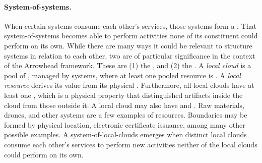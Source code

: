 \paragraph{System-of-systems.}
When certain systems consume each other's services, those systems form a .
That system-of-systems becomes able to perform activities none of its constituent  could perform on its own.
While there are many ways it could be relevant to structure systems in relation to each other, two are of particular significance in the context of the Arrowhead framework.
These are (1) the , and (2) the .
A \textit{local cloud} is a pool of , managed by systems, where at least one pooled resource is .
A \textit{local resource} derives its value from its physical .
Furthermore, all local clouds have at least one , which is a physical property that distinguished artifacts inside the cloud from those outside it.
A local cloud may also have  and .
Raw materials, drones, and other systems are a few examples of resources.
Boundaries may be formed by physical location, electronic certificate issuance, among many other possible examples.
A system-of-local-clouds emerges when distinct local clouds consume each other's services to perform new activities neither of the local clouds could perform on its own.
